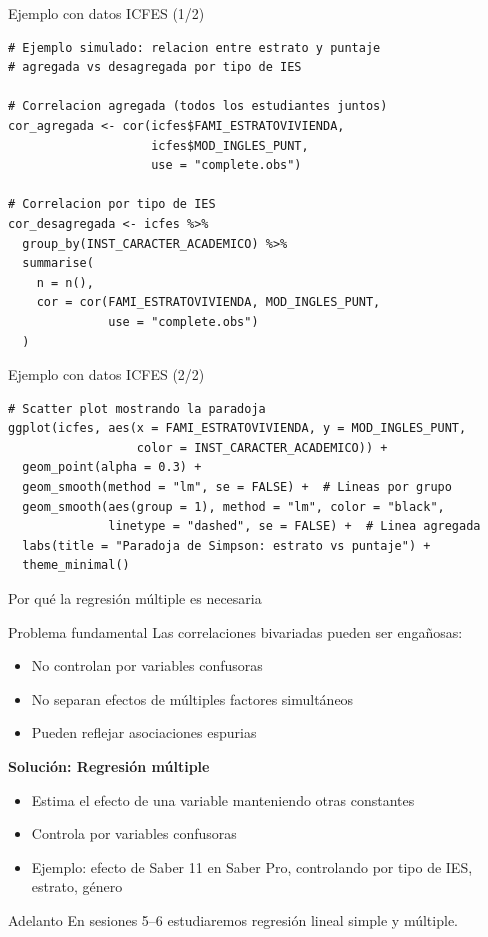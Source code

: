 \documentclass[aspectratio=169, 11pt]{beamer}
\begin{document}
\begin{frame}[fragile]{Ejemplo con datos ICFES (1/2)}
\begin{lstlisting}
# Ejemplo simulado: relacion entre estrato y puntaje
# agregada vs desagregada por tipo de IES

# Correlacion agregada (todos los estudiantes juntos)
cor_agregada <- cor(icfes$FAMI_ESTRATOVIVIENDA,
                    icfes$MOD_INGLES_PUNT,
                    use = "complete.obs")

# Correlacion por tipo de IES
cor_desagregada <- icfes %>%
  group_by(INST_CARACTER_ACADEMICO) %>%
  summarise(
    n = n(),
    cor = cor(FAMI_ESTRATOVIVIENDA, MOD_INGLES_PUNT,
              use = "complete.obs")
  )
\end{lstlisting}
\end{frame}

\begin{frame}[fragile]{Ejemplo con datos ICFES (2/2)}
\begin{lstlisting}
# Scatter plot mostrando la paradoja
ggplot(icfes, aes(x = FAMI_ESTRATOVIVIENDA, y = MOD_INGLES_PUNT,
                  color = INST_CARACTER_ACADEMICO)) +
  geom_point(alpha = 0.3) +
  geom_smooth(method = "lm", se = FALSE) +  # Lineas por grupo
  geom_smooth(aes(group = 1), method = "lm", color = "black",
              linetype = "dashed", se = FALSE) +  # Linea agregada
  labs(title = "Paradoja de Simpson: estrato vs puntaje") +
  theme_minimal()
\end{lstlisting}
\end{frame}

\begin{frame}{Por qué la regresión múltiple es necesaria}
\begin{block}{Problema fundamental}
Las correlaciones bivariadas pueden ser engañosas:
\begin{itemize}
\item No controlan por variables confusoras
\item No separan efectos de múltiples factores simultáneos
\item Pueden reflejar asociaciones espurias
\end{itemize}
\end{block}

\textbf{Solución: Regresión múltiple}
\begin{itemize}
\item Estima el efecto de una variable \alert{manteniendo otras constantes}
\item Controla por variables confusoras
\item Ejemplo: efecto de Saber 11 en Saber Pro, \alert{controlando por} tipo de IES, estrato, género
\end{itemize}

\vspace{0.3em}
\begin{alertblock}{Adelanto}
En sesiones 5--6 estudiaremos regresión lineal simple y múltiple.
\end{alertblock}
\end{frame}
\end{document}
